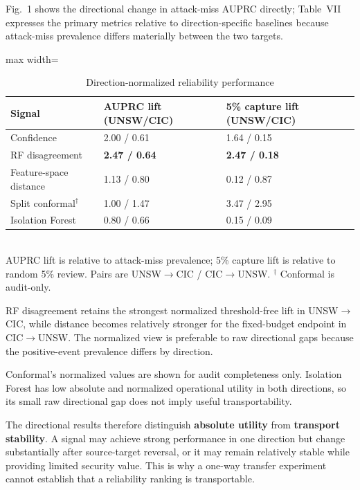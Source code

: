 \documentclass[conference]{IEEEtran}
\begin{document}
Fig.~1 shows the directional change in attack-miss AUPRC directly; Table~VII expresses the primary metrics relative to direction-specific baselines because attack-miss prevalence differs materially between the two targets.

\begin{table}[t]
\centering
\caption{Direction-normalized reliability performance}
\begin{adjustbox}{max width=\columnwidth}
\begin{tabular}{lll}
\toprule
\textbf{Signal} & \textbf{AUPRC lift (UNSW/CIC)} & \textbf{5\% capture lift (UNSW/CIC)} \\
\midrule
Confidence & 2.00 / 0.61 & 1.64 / 0.15 \\
RF disagreement & \textbf{2.47 / 0.64} & \textbf{2.47 / 0.18} \\
Feature-space distance & 1.13 / 0.80 & 0.12 / 0.87 \\
Split conformal$^\dagger$ & 1.00 / 1.47 & 3.47 / 2.95 \\
Isolation Forest & 0.80 / 0.66 & 0.15 / 0.09 \\
\bottomrule
\end{tabular}
\end{adjustbox}
\\[-1mm]
{\footnotesize AUPRC lift is relative to attack-miss prevalence; 5\% capture lift is relative to random 5\% review. Pairs are UNSW$\rightarrow$CIC / CIC$\rightarrow$UNSW. $^\dagger$ Conformal is audit-only.}
\end{table}

RF disagreement retains the strongest normalized threshold-free lift in UNSW$\rightarrow$CIC, while distance becomes relatively stronger for the fixed-budget endpoint in CIC$\rightarrow$UNSW. The normalized view is preferable to raw directional gaps because the positive-event prevalence differs by direction.

Conformal's normalized values are shown for audit completeness only. Isolation Forest has low absolute and normalized operational utility in both directions, so its small raw directional gap does not imply useful transportability.

The directional results therefore distinguish \textbf{absolute utility} from \textbf{transport stability}. A signal may achieve strong performance in one direction but change substantially after source-target reversal, or it may remain relatively stable while providing limited security value. This is why a one-way transfer experiment cannot establish that a reliability ranking is transportable.
\end{document}
